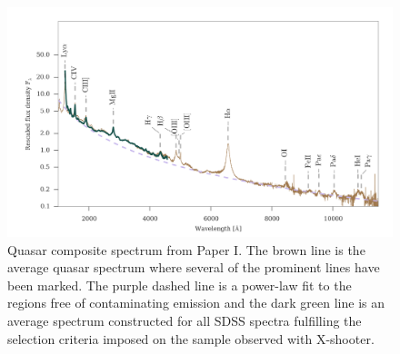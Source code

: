 \begin{figure}[htb]
	\includegraphics[width=\textwidth]{gfx/qsospec}
	\caption{Quasar composite spectrum from Paper I. The brown line is the average
quasar spectrum where several of the prominent lines have been marked. The purple
dashed line is a power-law fit to the regions free of contaminating emission and
 the dark green line is an average spectrum constructed for all SDSS spectra
fulfilling the selection criteria imposed on the sample observed with
X-shooter.}
	
	\label{fig:intro:qsospec}
\end{figure}


